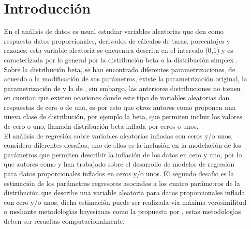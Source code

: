 \chapter{Introducci\'{o}n}


En el an\'{a}lisis de datos es usual estudiar variables aleatorias que den como respuesta datos proporcionales, derivados de c\'{a}lculos de tasas, porcentajes y razones; esta variable aleatoria se encuentra descrita en el intervalo (0,1) y es caracterizada  por lo general por la distribuci\'{o}n beta o la distribuci\'{o}n simplex \citep{Jorgensen1}. Sobre la distribuci\'{o}n beta, se han encontrado diferentes parametrizaciones, de acuerdo a la modificaci\'{o}n de sus par\'{a}metros, existe la parametrizaci\'{o}n original, la parametrizaci\'{o}n de \cite{Ferrari2} y la de \cite{Stasinopoulos2}, sin embargo, las anteriores distribuciones no tienen en cuentan que existen ocasiones donde este tipo de variables aleatorias dan respuestas de cero o de uno, es por esto que otros autores como \cite{Ospina2} proponen una nueva clase de distribuci\'{o}n, por ejemplo la beta, que permiten incluir los valores de cero o uno, llamada distribuci\'{o}n beta inflada por ceros o unos.\\

El an\'{a}lisis de regresi\'{o}n sobre variables aleatorias infladas con ceros y/o unos, considera diferentes desaf\'{\i}os, uno de ellos es la inclusi\'{o}n en la modelaci\'{o}n de los par\'{a}metros que permiten describir la inflaci\'{o}n de los datos en cero y uno, por lo que autores como \cite{Ospina1} y \cite{Kosmidis1} han trabajado sobre el desarrollo de modelos de regresi\'{o}n para datos proporcionales inflados en ceros y/o unos. El segundo desaf\'{\i}o es la estimaci\'{o}n de los par\'{a}metros regresores asociados a los cuatro par\'{a}metros de la distribuci\'{o}n que describe una variable aleatoria para datos proporcionales inflada con cero y/o unos, dicha estimaci\'{o}n puede ser realizada v\'{\i}a m\'{a}xima verosimilitud \citep{Ospina1} o mediante metodolog\'{\i}as bayesianas como la propuesta por \cite{Galvis1}, estas metodolog\'{\i}as deben ser resueltas computacionalmente.\\

